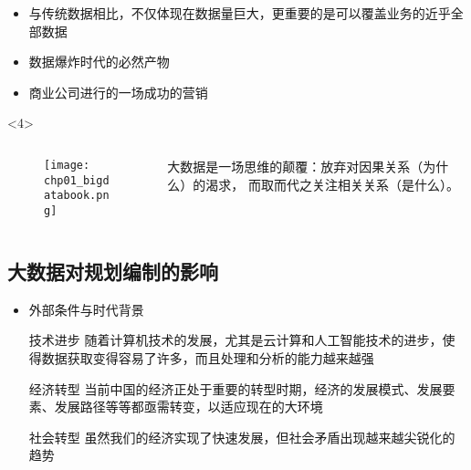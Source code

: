 \begin{frame}[t]{\subsecname}
\begin{itemize}
\item<1-> 与传统数据相比，不仅体现在数据量巨大，更重要的是可以覆盖业务的近乎全部数据
\item<2-> 数据爆炸时代的必然产物
\item<3-> 商业公司进行的一场成功的营销 
\end{itemize}

\begin{overlayarea}{\textwidth}{\textheight}
  \begin{onlyenv}<4>
     \begin{columns}
       \begin{column}{.3\textwidth}
       \begin{figure}
         \centering \texttt{[image: chp01\_bigdatabook.png]}
       \end{figure}
       \end{column}
       \begin{column}{.7\textwidth}
      \begin{ornamentblock}
          \hspace*{2em}大数据是一场思维的颠覆：放弃对因果关系（为什么）的渴求，
而取而代之关注相关关系（是什么）。\\
      \end{ornamentblock}
       \end{column}
     \end{columns}
  \end{onlyenv}
\end{overlayarea}
\end{frame}

\subsection{大数据对规划编制的影响}

\begin{frame}[t]{\subsecname}
\begin{itemize}
\item<1-> 外部条件与时代背景
\pause
\begin{commonbox}{技术进步} 
随着计算机技术的发展，尤其是云计算和人工智能技术的进步，使得数据获取变得容易了许多，而且处理和分析的能力越来越强
\end{commonbox}
\pause 
\begin{commonbox}{经济转型} 
当前中国的经济正处于重要的转型时期，经济的发展模式、发展要素、发展路径等等都亟需转变，以适应现在的大环境
\end{commonbox}
\pause
\begin{commonbox}{社会转型} 
虽然我们的经济实现了快速发展，但社会矛盾出现越来越尖锐化的趋势
\end{commonbox}
\end{itemize}
\end{frame}

